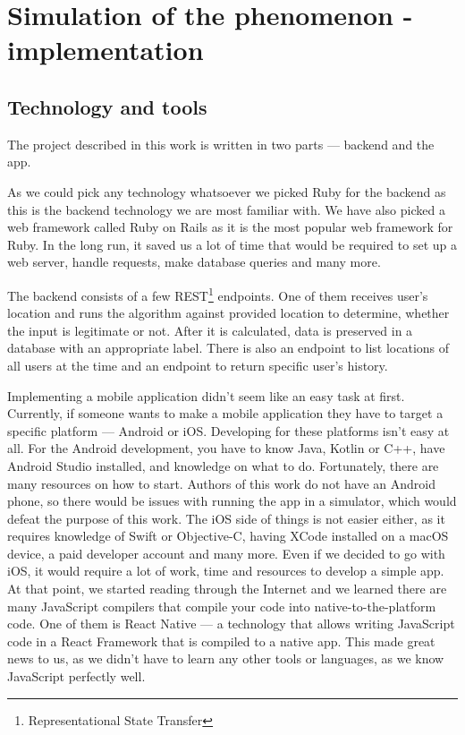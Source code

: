 \chapter{Simulation of the phenomenon - implementation}

\section{Technology and tools}

The project described in this work is written in two parts --- backend and the app.

As we could pick any technology whatsoever we picked Ruby for the backend as this is the backend technology we are most familiar with. We have also picked a web framework called Ruby on Rails as it is the most popular web framework for Ruby. In the long run, it saved us a lot of time that would be required to set up a web server, handle requests, make database queries and many more.

The backend consists of a few REST\footnote{Representational State Transfer} endpoints. One of them receives user's location and runs the algorithm against provided location to determine, whether the input is legitimate or not. After it is calculated, data is preserved in a database with an appropriate label. There is also an endpoint to list locations of all users at the time and an endpoint to return specific user's history.

Implementing a mobile application didn't seem like an easy task at first. Currently, if someone wants to make a mobile application they have to target a specific platform --- Android or iOS. Developing for these platforms isn't easy at all. For the Android development, you have to know Java, Kotlin or C++, have Android Studio installed, and knowledge on what to do. Fortunately, there are many resources on how to start. Authors of this work do not have an Android phone, so there would be issues with running the app in a simulator, which would defeat the purpose of this work. The iOS side of things is not easier either, as it requires knowledge of Swift or Objective-C, having XCode installed on a macOS device, a paid developer account and many more. Even if we decided to go with iOS, it would require a lot of work, time and resources to develop a simple app. At that point, we started reading through the Internet and we learned there are many JavaScript compilers that compile your code into native-to-the-platform code. One of them is React Native --- a technology that allows writing JavaScript code in a React Framework that is compiled to a native app. This made great news to us, as we didn't have to learn any other tools or languages, as we know JavaScript perfectly well.

